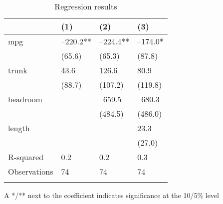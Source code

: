 \documentclass{article}
\begin{document}
\begin{table}[tbp] \centering
{}

\caption{Regression results}
\begin{tabularx}{\linewidth}{lCCC}

\toprule
&{(1)}&{(2)}&{(3)} \tabularnewline
\midrule \addlinespace[\belowrulesep]
mpg&--220.2**&--224.4**&--174.0* \tabularnewline
&(65.6)&(65.3)&(87.8) \tabularnewline
trunk&43.6&126.6&80.9 \tabularnewline
&(88.7)&(107.2)&(119.8) \tabularnewline
headroom&&--659.5&--680.3 \tabularnewline
&&(484.5)&(486.0) \tabularnewline
length&&&23.3 \tabularnewline
&&&(27.0) \tabularnewline
\midrule R-squared&0.2&0.2&0.3 \tabularnewline
Observations&74&74&74 \tabularnewline
\bottomrule \addlinespace[\belowrulesep]

\end{tabularx}
\begin{flushleft}
\footnotesize A */** next to the coefficient indicates significance at the 10/5\% level
\end{flushleft}
\end{table}
\end{document}
